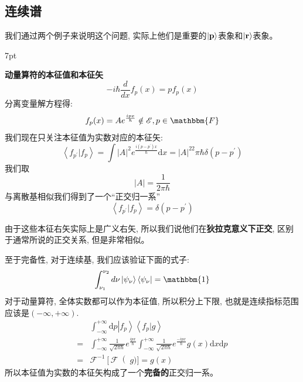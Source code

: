\documentclass[a4paper,zihao=-4,linespread=1]{ctexrep}
\newenvironment{thinknote}{%
\def\FrameCommand{%
\hspace{1pt}%
{\color{BurlyWood}\vrule width 2pt}%
{\color{formalshade}\vrule width 4pt}%
\colorbox{formalshade}%
}%
\MakeFramed{\advance\hsize-\width\FrameRestore}%
\noindent\hspace{-4.55pt}%
\begin{adjustwidth}{}{7pt}%
\vspace{2pt}\vspace{2pt}%
}
{%
\vspace{2pt}\end{adjustwidth}\endMakeFramed%
}
\begin{document}
    \subsection*{连续谱}
    我们通过两个例子来说明这个问题, 实际上他们是重要的$\left | \bf{p}  \right \rangle$表象和$\left | \bf{r}  \right \rangle$表象。
    \begin{thinknote}
        \textbf{动量算符的本征值和本征矢}
        \begin{equation}
            -i\hbar\frac{d}{dx}f_p(x)=pf_p(x)
        \end{equation}
        分离变量解方程得:
        \begin{equation}
            f_p(x)=Ae^{\frac{ipx}{\hbar}}\notin\mathscr{E},p\in\mathbbm{F}
        \end{equation}
        我们现在只关注本征值为实数对应的本征矢:
        \begin{equation}
            \left \langle f_{p^\prime}  | f_{p}  \right \rangle=\int \left | A \right |^2e^{\frac{i(p-p^\prime )x}{\hbar } }\mathrm{d}x =\left | A \right |^22\pi\hbar \delta(p-p^\prime) 
        \end{equation}
        我们取\[\left|A\right|=\frac{1}{2\pi\hbar}\]
        与离散基相似我们得到了一个“正交归一系”
        \begin{equation}
            \left \langle f_{p^\prime}  | f_{p}  \right \rangle=\delta(p-p^\prime)
        \end{equation}

        由于这些本征右矢实际上是广义右矢, 所以我们说他们在\textbf{狄拉克意义下正交}, 区别于通常所说的正交关系, 但是非常相似。
        
        至于完备性, 对于连续基, 我们应该验证下面的式子:
        \begin{equation}
            \int_{{\nu _1}}^{{\nu _2}} {d\nu \left| {{\psi _\nu }} \right\rangle \left\langle {{\psi _\nu }} \right|} =\mathbbm{1}
        \end{equation}
        对于动量算符, 全体实数都可以作为本征值, 所以积分上下限, 也就是连续指标范围应该是$\left(-\infty,+\infty\right)$.
        \begin{align*}
            &\int_{-\infty }^{+\infty}\mathrm{d}p\left | f_p \right \rangle\left \langle f_p  | g  \right \rangle   \\
            =&\int_{-\infty }^{+\infty }\frac{1}{\sqrt{2\pi\hbar}}e^{\frac{ipx}{\hbar}}\int_{-\infty }^{+\infty }\frac{1}{\sqrt{2\pi\hbar}}e^{\frac{-ipx}{\hbar}}g(x)\mathrm{d}x \mathrm{d}p\\   
            =&\mathscr{F}^{-1}\left[\mathscr{F}\right(g)]=g(x)
        \end{align*}
        所以本征值为实数的本征矢构成了一个\textbf{完备的}正交归一系。
    \end{thinknote}
\end{document}
